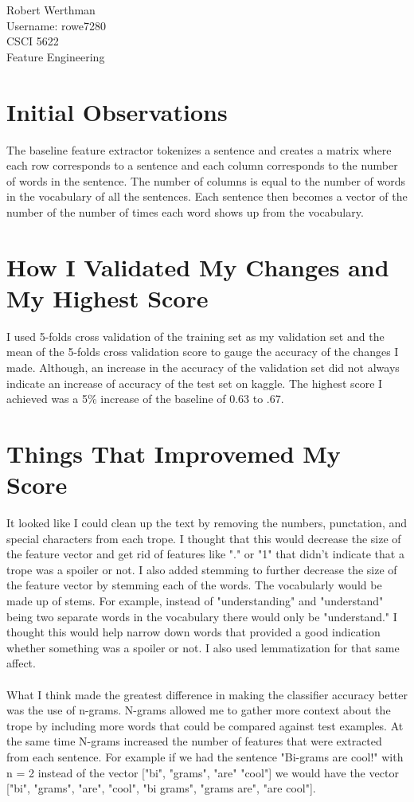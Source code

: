 \documentclass[11pt]{article}
\begin{document}
\noindent
Robert Werthman\\
Username: rowe7280\\
CSCI 5622\\
Feature Engineering\\

\section*{Initial Observations}
The baseline feature extractor tokenizes a sentence and creates a matrix where each row corresponds to a sentence and each column corresponds to the number of words in the sentence.  The number of columns is equal to the number of words in the vocabulary of all the sentences.  Each sentence then becomes a vector of the number of the number of times each word shows up from the vocabulary.

\section*{How I Validated My Changes and My Highest Score}
I used 5-folds cross validation of the training set as my validation set and the mean of the 5-folds cross validation score to gauge the accuracy of the changes I made.  Although, an increase in the accuracy of the validation set did not always indicate an increase of accuracy of the test set on kaggle.  The highest score I achieved was a 5\% increase of the baseline of 0.63 to .67.

\section*{Things That Improvemed My Score}
It looked like I could clean up the text by removing the numbers, punctation, and special characters from each trope.  I thought that this would decrease the size of the feature vector and get rid of features like "." or "1" that didn't indicate that a trope was a spoiler or not.  I also added stemming to further decrease the size of the feature vector by stemming each of the words.  The vocabularly would be made up of stems.  For example, instead of "understanding" and "understand" being two separate words in the vocabulary there would only be "understand."  I thought this would help narrow down words that provided a good indication whether something was a spoiler or not.  I also used lemmatization for that same affect.
\\ \\
What I think made the greatest difference in making the classifier accuracy better was the use of n-grams.  N-grams allowed me to gather more context about the trope by including more words that could be compared against test examples.  At the same time N-grams increased the number of features that were extracted from each sentence.  For example if we had the sentence "Bi-grams are cool!" with n = 2 instead of the vector ["bi", "grams", "are" "cool"] we would have the vector ["bi", "grams", "are", "cool", "bi grams", "grams are", "are cool"]. 
\end{document}
